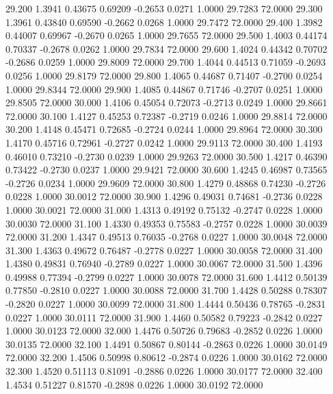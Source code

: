   29.200   1.3941   0.43675   0.69209  -0.2653   0.0271   1.0000  29.7283  72.0000
  29.300   1.3961   0.43840   0.69590  -0.2662   0.0268   1.0000  29.7472  72.0000
  29.400   1.3982   0.44007   0.69967  -0.2670   0.0265   1.0000  29.7655  72.0000
  29.500   1.4003   0.44174   0.70337  -0.2678   0.0262   1.0000  29.7834  72.0000
  29.600   1.4024   0.44342   0.70702  -0.2686   0.0259   1.0000  29.8009  72.0000
  29.700   1.4044   0.44513   0.71059  -0.2693   0.0256   1.0000  29.8179  72.0000
  29.800   1.4065   0.44687   0.71407  -0.2700   0.0254   1.0000  29.8344  72.0000
  29.900   1.4085   0.44867   0.71746  -0.2707   0.0251   1.0000  29.8505  72.0000
  30.000   1.4106   0.45054   0.72073  -0.2713   0.0249   1.0000  29.8661  72.0000
  30.100   1.4127   0.45253   0.72387  -0.2719   0.0246   1.0000  29.8814  72.0000
  30.200   1.4148   0.45471   0.72685  -0.2724   0.0244   1.0000  29.8964  72.0000
  30.300   1.4170   0.45716   0.72961  -0.2727   0.0242   1.0000  29.9113  72.0000
  30.400   1.4193   0.46010   0.73210  -0.2730   0.0239   1.0000  29.9263  72.0000
  30.500   1.4217   0.46390   0.73422  -0.2730   0.0237   1.0000  29.9421  72.0000
  30.600   1.4245   0.46987   0.73565  -0.2726   0.0234   1.0000  29.9609  72.0000
  30.800   1.4279   0.48868   0.74230  -0.2726   0.0228   1.0000  30.0012  72.0000
  30.900   1.4296   0.49031   0.74681  -0.2736   0.0228   1.0000  30.0021  72.0000
  31.000   1.4313   0.49192   0.75132  -0.2747   0.0228   1.0000  30.0030  72.0000
  31.100   1.4330   0.49353   0.75583  -0.2757   0.0228   1.0000  30.0039  72.0000
  31.200   1.4347   0.49513   0.76035  -0.2768   0.0227   1.0000  30.0048  72.0000
  31.300   1.4363   0.49672   0.76487  -0.2778   0.0227   1.0000  30.0058  72.0000
  31.400   1.4380   0.49831   0.76940  -0.2789   0.0227   1.0000  30.0067  72.0000
  31.500   1.4396   0.49988   0.77394  -0.2799   0.0227   1.0000  30.0078  72.0000
  31.600   1.4412   0.50139   0.77850  -0.2810   0.0227   1.0000  30.0088  72.0000
  31.700   1.4428   0.50288   0.78307  -0.2820   0.0227   1.0000  30.0099  72.0000
  31.800   1.4444   0.50436   0.78765  -0.2831   0.0227   1.0000  30.0111  72.0000
  31.900   1.4460   0.50582   0.79223  -0.2842   0.0227   1.0000  30.0123  72.0000
  32.000   1.4476   0.50726   0.79683  -0.2852   0.0226   1.0000  30.0135  72.0000
  32.100   1.4491   0.50867   0.80144  -0.2863   0.0226   1.0000  30.0149  72.0000
  32.200   1.4506   0.50998   0.80612  -0.2874   0.0226   1.0000  30.0162  72.0000
  32.300   1.4520   0.51113   0.81091  -0.2886   0.0226   1.0000  30.0177  72.0000
  32.400   1.4534   0.51227   0.81570  -0.2898   0.0226   1.0000  30.0192  72.0000
